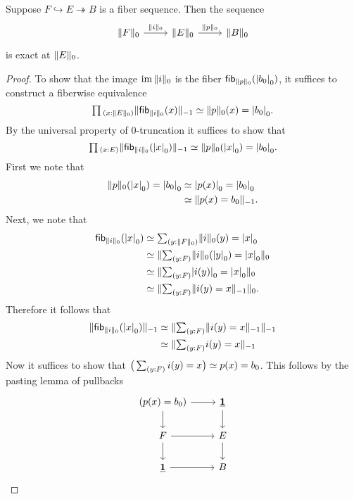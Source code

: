 \begin{lem}
Suppose $F\hookrightarrow E \twoheadrightarrow B$ is a fiber sequence. Then the sequence
\begin{equation*}
\begin{tikzcd}
\trunc{0}{F} \arrow[r,"\trunc{0}{i}"] & \trunc{0}{E} \arrow[r,"\trunc{0}{p}"] & \trunc{0}{B}
\end{tikzcd}
\end{equation*}
is exact at $\trunc{0}{E}$. 
\end{lem}

\begin{proof}
To show that the image $\im\trunc{0}{i}$ is the fiber $\fib{\trunc{0}{p}}{\tproj{0}{b_0}}$, it suffices to construct a fiberwise equivalence
\begin{equation*}
\prd{x:\trunc{0}{E}} \trunc{-1}{\fib{\trunc{0}{i}}{x}} \eqvsym \trunc{0}{p}(x)=\tproj{0}{b_0}.
\end{equation*}
By the universal property of $0$-truncation it suffices to show that
\begin{equation*}
\prd{x:E} \trunc{-1}{\fib{\trunc{0}{i}}{\tproj{0}{x}}} \eqvsym \trunc{0}{p}(\tproj{0}{x})=\tproj{0}{b_0}.
\end{equation*}
First we note that 
\begin{align*}
\trunc{0}{p}(\tproj{0}{x})=\tproj{0}{b_0} & \eqvsym \tproj{0}{p(x)} = \tproj{0}{b_0} \\
& \eqvsym \trunc{-1}{p(x)=b_0}.
\end{align*}
Next, we note that
\begin{align*}
\fib{\trunc{0}{i}}{\tproj{0}{x}} & \eqvsym \sm{y:\trunc{0}{F}}\trunc{0}{i}(y)=\tproj{0}{x} \\
& \eqvsym \trunc{0}{\sm{y:F}\trunc{0}{i}(\tproj{0}{y})=\tproj{0}{x}} \\
& \eqvsym \trunc{0}{\sm{y:F}\tproj{0}{i(y)}=\tproj{0}{x}} \\
& \eqvsym \trunc{0}{\sm{y:F}\trunc{-1}{i(y)=x}}.
\end{align*}
Therefore it follows that
\begin{align*}
\trunc{-1}{\fib{\trunc{0}{i}}{\tproj{0}{x}}} & \eqvsym \trunc{-1}{\sm{y:F}\trunc{-1}{i(y)=x}} \\
& \eqvsym \trunc{-1}{\sm{y:F}i(y)=x} \\
\end{align*}
Now it suffices to show that $\eqv{\big(\sm{y:F}i(y)=x\big)}{p(x)=b_0}$. This follows by the pasting lemma of pullbacks
\begin{equation*}
\begin{tikzcd}
(p(x)=b_0) \arrow[r] \arrow[d] & \unit \arrow[d] \\
F \arrow[r] \arrow[d] & E \arrow[d] \\
\unit \arrow[r] & B
\end{tikzcd}
\end{equation*}
\end{proof}

